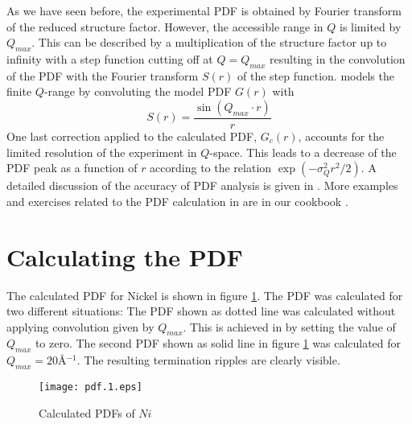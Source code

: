 As we have seen before, the experimental PDF is obtained by
Fourier transform of the reduced structure factor. However, the
accessible range in $Q$ is limited by $Q_{max}$. This can be
described by a multiplication of the structure factor up to
infinity with a step function cutting off at $Q=Q_{max}$ resulting
in the convolution of the PDF with the Fourier transform  $S(r)$
of the step function. \Discus models the finite $Q$-range by
convoluting the model PDF $G(r)$ with
%
\begin{equation}
  S(r) = \frac{\sin(Q_{max} \cdot r)}{r}
  \label{eq_sinc}
\end{equation}
%
One last correction applied to the calculated PDF, $G_{c}(r)$,
accounts for the limited resolution of the experiment in $Q$-space.
This leads to a decrease of the PDF peak as a function of $r$
according to the relation $\exp(-\sigma_{Q}^{2}r^{2}/2)$. A detailed
discussion of the accuracy of PDF analysis is given in
\citet{toeg92}. More examples and exercises related to the PDF
calculation in \Discus are in our cookbook \citep{nedpro}.


\section{Calculating the PDF \label{pdf-calc}}

The calculated PDF for Nickel is shown in figure \ref{pdf-fig1}.
The PDF was calculated for two different situations: The PDF shown
as dotted line was calculated without applying convolution given
by $Q_{max}$. This is achieved in \Discus by setting the
value of $Q_{max}$ to zero. The second PDF shown as solid line in
figure \ref{pdf-fig1} was calculated for $Q_{max} = 20$\AA$^{-1}$.
The resulting termination ripples are clearly visible.
%
\begin{figure}[!b]
   \centering
   \texttt{[image: pdf.1.eps]}
   \caption{Calculated PDFs of $Ni$}
   \label{pdf-fig1}
\end{figure}
%

